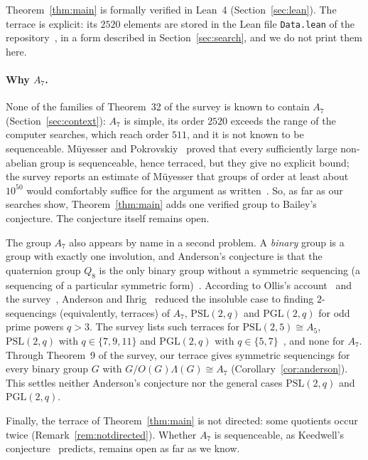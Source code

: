 \documentclass[11pt]{article}
\theoremstyle{definition}
\theoremstyle{remark}
\newcommand{\Alt}{A_7}
\begin{document}
Theorem~\ref{thm:main} is formally verified in Lean~4
(Section~\ref{sec:lean}). The terrace is explicit: its $2520$ elements are
stored in the Lean file \texttt{Data.lean} of the repository~\cite{repo}, in
a form described in Section~\ref{sec:search}, and we do not print them here.

\paragraph{Why $A_7$.}
None of the families of Theorem~32 of the survey is known to contain $\Alt$
(Section~\ref{sec:context}): $\Alt$ is simple, its order $2520$ exceeds the
range of the computer searches, which reach order $511$, and it is not known
to be sequenceable. Müyesser and Pokrovskiy~\cite[Theorem~6.12]{mp} proved
that every sufficiently large non-abelian group is sequenceable, hence
terraced, but they give no explicit bound; the survey reports an estimate of
Müyesser that groups of order at least about $10^{50}$ would comfortably
suffice for the argument as written~\cite[p.~18]{survey}. So, as far as our
searches show, Theorem~\ref{thm:main} adds one verified group to Bailey's
conjecture. The conjecture itself remains open.

The group $\Alt$ also appears by name in a second problem. A \emph{binary}
group is a group with exactly one involution, and Anderson's conjecture is
that the quaternion group $Q_8$ is the only binary group without a symmetric
sequencing (a sequencing of a particular symmetric form)~\cite[Conjecture~16
and Section~2.3]{survey}. According to Ollis's account~\cite[Section~3]{ollis16}
and the survey~\cite[p.~15]{survey}, Anderson and Ihrig~\cite{ai93b} reduced
the insoluble case to finding $2$-sequencings (equivalently, terraces) of
$\Alt$, $\mathrm{PSL}(2,q)$ and $\mathrm{PGL}(2,q)$ for odd prime powers
$q>3$. The survey lists such terraces for $\mathrm{PSL}(2,5)\cong A_5$,
$\mathrm{PSL}(2,q)$ with $q\in\{7,9,11\}$ and $\mathrm{PGL}(2,q)$ with
$q\in\{5,7\}$~\cite[p.~15]{survey}, and none for $\Alt$. Through Theorem~9 of
the survey, our terrace gives symmetric sequencings for every binary group $G$
with $G/O(G)\Lambda(G)\cong\Alt$ (Corollary~\ref{cor:anderson}). This settles
neither Anderson's conjecture nor the general cases $\mathrm{PSL}(2,q)$ and
$\mathrm{PGL}(2,q)$.

Finally, the terrace of Theorem~\ref{thm:main} is not directed: some
quotients occur twice (Remark~\ref{rem:notdirected}). Whether $\Alt$ is
sequenceable, as Keedwell's conjecture~\cite[Conjecture~15]{survey} predicts,
remains open as far as we know.
\end{document}
